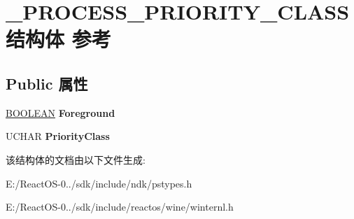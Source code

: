 \hypertarget{struct___p_r_o_c_e_s_s___p_r_i_o_r_i_t_y___c_l_a_s_s}{}\section{\+\_\+\+P\+R\+O\+C\+E\+S\+S\+\_\+\+P\+R\+I\+O\+R\+I\+T\+Y\+\_\+\+C\+L\+A\+S\+S结构体 参考}
\label{struct___p_r_o_c_e_s_s___p_r_i_o_r_i_t_y___c_l_a_s_s}
\subsection*{Public 属性}
\begin{DoxyCompactItemize}
\item 
\mbox{\label{struct___p_r_o_c_e_s_s___p_r_i_o_r_i_t_y___c_l_a_s_s_abeb8701e681a78394c05b0645b667660}} 
\hyperlink{_processor_bind_8h_a112e3146cb38b6ee95e64d85842e380a}{B\+O\+O\+L\+E\+AN} {\bfseries Foreground}
\item 
\mbox{\label{struct___p_r_o_c_e_s_s___p_r_i_o_r_i_t_y___c_l_a_s_s_a59812b0c2d02666a92c191c8f31ffa0d}} 
U\+C\+H\+AR {\bfseries Priority\+Class}
\end{DoxyCompactItemize}


该结构体的文档由以下文件生成\+:\begin{DoxyCompactItemize}
\item 
E\+:/\+React\+O\+S-\/0../sdk/include/ndk/pstypes.\+h\item 
E\+:/\+React\+O\+S-\/0../sdk/include/reactos/wine/winternl.\+h\end{DoxyCompactItemize}
